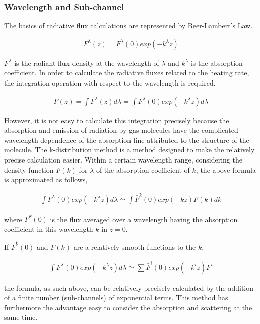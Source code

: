 \hypertarget{wavelength-and-sub-channel}{%
\subsubsection{Wavelength and
Sub-channel}\label{wavelength-and-sub-channel}}

The basics of radiative flux calculations are represented by
Beer-Lambert's Law.

\begin{eqnarray}
  F^\lambda(z) = F^\lambda(0) exp (-k^\lambda z)
\end{eqnarray}

\(F^{\lambda}\) is the radiant flux density at the wavelength of
\(\lambda\) and \(k^{\lambda}\) is the absorption coefficient. In order
to calculate the radiative fluxes related to the heating rate, the
integration operation with respect to the wavelength is required.

\begin{eqnarray}
  F(z) = \int F^\lambda(z) d \lambda= \int F^\lambda(0) exp (-k^\lambda z) d \lambda
\end{eqnarray}

However, it is not easy to calculate this integration precisely because
the absorption and emission of radiation by gas molecules have the
complicated wavelength dependence of the absorption line attributed to
the structure of the molecule. The k-distribution method is a method
designed to make the relatively precise calculation easier. Within a
certain wavelength range, considering the density function \(F(k)\) for
\(\lambda\) of the absorption coefficient of \(k\), the above formula is
approximated as follows,

\begin{eqnarray}
 \int F^\lambda(0) exp (-k^\lambda z) d \lambda
 \simeq \int \bar{F}^k(0) exp (-k z) F(k) dk
\end{eqnarray}

where \(\bar{F}^k(0)\) is the flux averaged over a wavelength having the
absorption coefficient in this wavelength \(k\) in \(z=0\).

If \(\bar{F}^k(0)\) and \(F(k)\) are a relatively smooth functions to
the \(k\),

\begin{eqnarray}
 \int F^\lambda(0) exp (-k^\lambda z) d \lambda
 \simeq \sum \bar{F}^i(0) exp (-k^i z) F^i
\end{eqnarray}

the formula, as such above, can be relatively precisely calculated by
the addition of a finite number (sub-channels) of exponential terms.
This method has furthermore the advantage easy to consider the
absorption and scattering at the same time.

